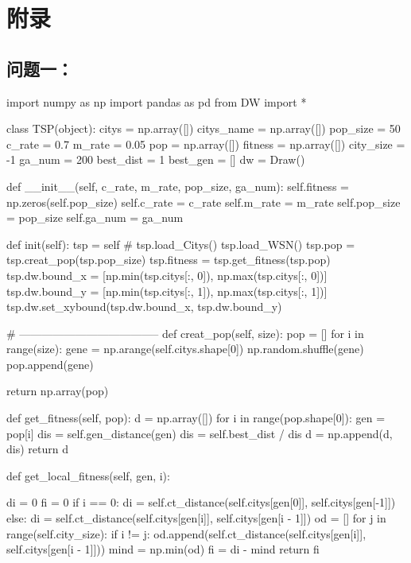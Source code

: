 \documentclass{ctexart}
\begin{document}
    \section*{附录}
    \subsection*{问题一：}
    \begin{python}
import numpy as np
import pandas as pd
from DW import *


class TSP(object):
    citys = np.array([])
    citys_name = np.array([])
    pop_size = 50
    c_rate = 0.7
    m_rate = 0.05
    pop = np.array([])
    fitness = np.array([])
    city_size = -1
    ga_num = 200
    best_dist = 1
    best_gen = []
    dw = Draw()

    def __init__(self, c_rate, m_rate, pop_size, ga_num):
        self.fitness = np.zeros(self.pop_size)
        self.c_rate = c_rate
        self.m_rate = m_rate
        self.pop_size = pop_size
        self.ga_num = ga_num

    def init(self):
        tsp = self
        # tsp.load_Citys()
        tsp.load_WSN()
        tsp.pop = tsp.creat_pop(tsp.pop_size)
        tsp.fitness = tsp.get_fitness(tsp.pop)
        tsp.dw.bound_x = [np.min(tsp.citys[:, 0]), np.max(tsp.citys[:, 0])]
        tsp.dw.bound_y = [np.min(tsp.citys[:, 1]), np.max(tsp.citys[:, 1])]
        tsp.dw.set_xybound(tsp.dw.bound_x, tsp.dw.bound_y)

    # --------------------------------------
    def creat_pop(self, size):
        pop = []
        for i in range(size):
            gene = np.arange(self.citys.shape[0])
            np.random.shuffle(gene)
            pop.append(gene)

        return np.array(pop)

    def get_fitness(self, pop):
        d = np.array([])
        for i in range(pop.shape[0]):
            gen = pop[i]  
            dis = self.gen_distance(gen)
            dis = self.best_dist / dis
            d = np.append(d, dis)
        return d

    def get_local_fitness(self, gen, i):
 
        di = 0
        fi = 0
        if i == 0:
            di = self.ct_distance(self.citys[gen[0]], self.citys[gen[-1]])
        else:
            di = self.ct_distance(self.citys[gen[i]], self.citys[gen[i - 1]])
        od = []
        for j in range(self.city_size):
            if i != j:
                od.append(self.ct_distance(self.citys[gen[i]], self.citys[gen[i - 1]]))
        mind = np.min(od)
        fi = di - mind
        return fi


\end{python}
\end{document}
